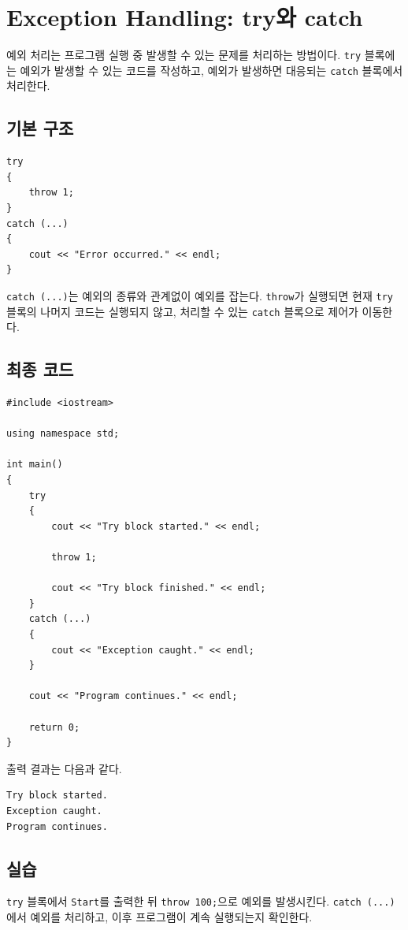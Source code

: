 \documentclass[11pt,a4paper]{article}
\begin{document}
\section{Exception Handling: try와 catch}
예외 처리는 프로그램 실행 중 발생할 수 있는 문제를 처리하는 방법이다.
\texttt{try} 블록에는 예외가 발생할 수 있는 코드를 작성하고,
예외가 발생하면 대응되는 \texttt{catch} 블록에서 처리한다.

\subsection{기본 구조}
\begin{lstlisting}
try
{
    throw 1;
}
catch (...)
{
    cout << "Error occurred." << endl;
}
\end{lstlisting}

\texttt{catch (...)}는 예외의 종류와 관계없이 예외를 잡는다.
\texttt{throw}가 실행되면 현재 \texttt{try} 블록의 나머지 코드는 실행되지 않고,
처리할 수 있는 \texttt{catch} 블록으로 제어가 이동한다.

\subsection{최종 코드}
\begin{lstlisting}
#include <iostream>

using namespace std;

int main()
{
    try
    {
        cout << "Try block started." << endl;

        throw 1;

        cout << "Try block finished." << endl;
    }
    catch (...)
    {
        cout << "Exception caught." << endl;
    }

    cout << "Program continues." << endl;

    return 0;
}
\end{lstlisting}

출력 결과는 다음과 같다.

\begin{verbatim}
Try block started.
Exception caught.
Program continues.
\end{verbatim}

\subsection{실습}
\begin{practicebox}
\texttt{try} 블록에서 \texttt{Start}를 출력한 뒤 \texttt{throw 100;}으로 예외를 발생시킨다.
\texttt{catch (...)}에서 예외를 처리하고, 이후 프로그램이 계속 실행되는지 확인한다.
\end{practicebox}
\end{document}
